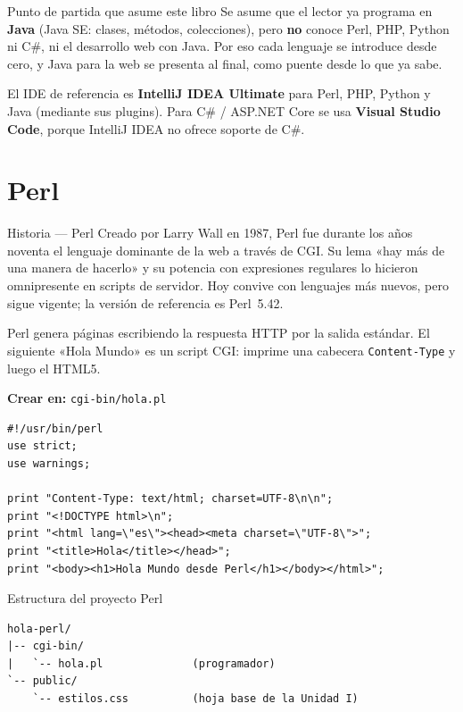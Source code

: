 \begin{cajaadvertencia}{Punto de partida que asume este libro}
Se asume que el lector ya programa en \textbf{Java} (Java SE: clases,
métodos, colecciones), pero \textbf{no} conoce Perl, PHP, Python ni C\#,
ni el desarrollo web con Java. Por eso cada lenguaje se introduce desde
cero, y Java para la web se presenta al final, como puente desde lo que
ya sabe.
\end{cajaadvertencia}

El IDE de referencia es \textbf{IntelliJ IDEA Ultimate} para Perl, PHP,
Python y Java (mediante sus plugins). Para C\# / ASP.NET Core se usa
\textbf{Visual Studio Code}, porque IntelliJ IDEA no ofrece soporte de
C\#.

\section{Perl}
\label{sec:cap5:perl}

\begin{cajahistoria}{Historia --- Perl}
Creado por Larry Wall en 1987, Perl fue durante los años noventa el
lenguaje dominante de la web a través de CGI. Su lema «hay más de una
manera de hacerlo» y su potencia con expresiones regulares lo hicieron
omnipresente en scripts de servidor. Hoy convive con lenguajes más
nuevos, pero sigue vigente; la versión de referencia es Perl~5.42.
\end{cajahistoria}

Perl genera páginas escribiendo la respuesta HTTP por la salida
estándar. El siguiente «Hola Mundo» es un script CGI: imprime una
cabecera \texttt{Content-Type} y luego el HTML5.

{\small\textbf{Crear en:} \texttt{cgi-bin/hola.pl}}
\begin{lstlisting}[style=perl,caption={hola.pl --- Hola Mundo en Perl (CGI)},label={lst:c5-perl-hola}]
#!/usr/bin/perl
use strict;
use warnings;

print "Content-Type: text/html; charset=UTF-8\n\n";
print "<!DOCTYPE html>\n";
print "<html lang=\"es\"><head><meta charset=\"UTF-8\">";
print "<title>Hola</title></head>";
print "<body><h1>Hola Mundo desde Perl</h1></body></html>";
\end{lstlisting}

\begin{cajaejemplo}{Estructura del proyecto Perl}
\begin{lstlisting}[style=shell,caption={Estructura minima de un proyecto Perl/CGI},label={lst:c5-perl-tree}]
hola-perl/
|-- cgi-bin/
|   `-- hola.pl              (programador)
`-- public/
    `-- estilos.css          (hoja base de la Unidad I)
\end{lstlisting}
\end{cajaejemplo}

